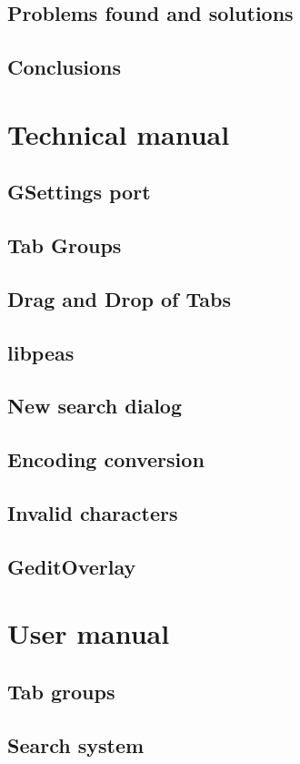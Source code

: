 \documentclass[a4paper,11pt,twoside]{book}
\begin{document}
\chapter{Problems found and solutions}
\chapter{Conclusions}
\part{Technical manual}


\chapter{GSettings port}
\chapter{Tab Groups}
\chapter{Drag and Drop of Tabs}
\chapter{libpeas}
\chapter{New search dialog}
\chapter{Encoding conversion}
\chapter{Invalid characters}
\chapter{GeditOverlay}
\part{User manual}
\chapter{Tab groups}
\chapter{Search system}

\nocite{*}


\end{document}
